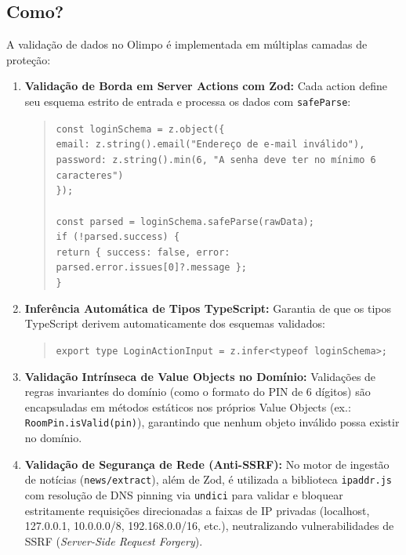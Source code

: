 \documentclass[12pt,a4paper]{article}
\begin{document}
\subsection{Como?}
A validação de dados no Olimpo é implementada em múltiplas camadas de proteção:
\begin{enumerate}
  \item \textbf{Validação de Borda em Server Actions com Zod:}
  Cada action define seu esquema estrito de entrada e processa os dados com \texttt{safeParse}:
  \begin{quote}
    \texttt{const loginSchema = z.object(\{\\
    \quad email: z.string().email("Endereço de e-mail inválido"),\\
    \quad password: z.string().min(6, "A senha deve ter no mínimo 6 caracteres")\\
    \});\\
    \\
    const parsed = loginSchema.safeParse(rawData);\\
    if (!parsed.success) \{\\
    \quad return \{ success: false, error: parsed.error.issues[0]?.message \};\\
    \}}
  \end{quote}
  \item \textbf{Inferência Automática de Tipos TypeScript:}
  Garantia de que os tipos TypeScript derivem automaticamente dos esquemas validados:
  \begin{quote}
    \texttt{export type LoginActionInput = z.infer<typeof loginSchema>;}
  \end{quote}
  \item \textbf{Validação Intrínseca de Value Objects no Domínio:}
  Validações de regras invariantes do domínio (como o formato do PIN de 6 dígitos) são encapsuladas em métodos estáticos nos próprios Value Objects (ex.: \texttt{RoomPin.isValid(pin)}), garantindo que nenhum objeto inválido possa existir no domínio.
  \item \textbf{Validação de Segurança de Rede (Anti-SSRF):}
  No motor de ingestão de notícias (\texttt{news/extract}), além de Zod, é utilizada a biblioteca \texttt{ipaddr.js} com resolução de DNS pinning via \texttt{undici} para validar e bloquear estritamente requisições direcionadas a faixas de IP privadas (localhost, 127.0.0.1, 10.0.0.0/8, 192.168.0.0/16, etc.), neutralizando vulnerabilidades de SSRF (\textit{Server-Side Request Forgery}).
\end{enumerate}
\end{document}
